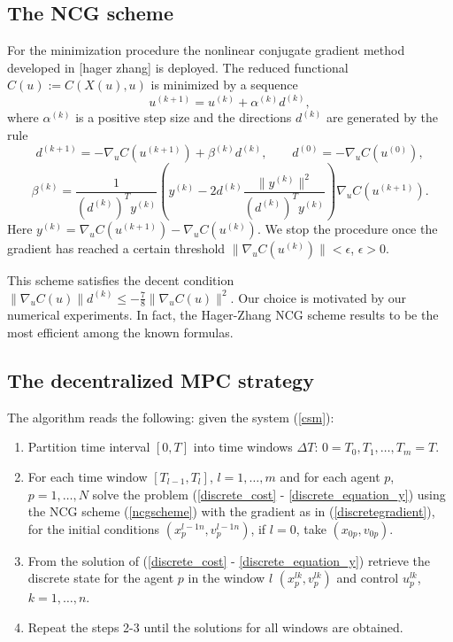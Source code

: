 \documentclass[a4paper,10pt, english]{article}
\begin{document}
 \subsection{The NCG scheme}
  For the minimization procedure the nonlinear conjugate gradient  method developed in [hager zhang] is deployed.
  The reduced functional $C(u):=C(X(u), u)$ is minimized by a sequence
  \begin{equation}
  u^{(k+1)} =   u^{(k)} + \alpha^{(k)} d^{(k)},
  \label{ncgscheme}
   \end{equation}  
  where $\alpha^{(k)}$ is a positive step size and the directions $d^{(k)}$ are generated by the rule
  \begin{equation}
  d^{(k+1)} = - \nabla_u C(u^{(k+1)}) + \beta^{(k)} d^{(k)}, \qquad d^{(0)} = -\nabla_u C(u^{(0)}),
  \label{drct}
  \end{equation}
  \begin{equation}
  \beta^{(k)} = \frac{1}{(d^{(k)})^T y^{(k)}} \left( y^{(k)} - 2d^{(k)}\frac{\|y^{(k)}\|^2}{(d^{(k)})^T y^{(k)}}\right)\nabla_u C(u^{(k+1)}).
  \label{drct}
  \end{equation}  
  Here $y^{(k)} = \nabla_u C(u^{(k+1)}) - \nabla_u C(u^{(k)})$. 
  We stop the procedure once the gradient has reached a certain threshold $\|\nabla_u C(u^{(k)})\| < \epsilon$, $\epsilon > 0$.
   
  This scheme satisfies the decent condition $\|\nabla_u C(u)\|d^{(k)} \leq -\frac{7}{8}\|\nabla_u C(u)\|^2$. Our choice is motivated by our numerical experiments. In fact, the Hager-Zhang NCG scheme results to be the most efficient among the known formulas. 
  
  
 
 \subsection{The decentralized MPC strategy}
  The algorithm reads the following: given the system (\ref{csm}):
  
 \begin{enumerate}
   \item Partition time interval $[0, T]$ into time windows $\Delta T$: $0 = T_0, T_1, \dots, T_m = T$.
   \item For each time window  $[T_{l-1}, T_{l}]$, $l = 1, \dots, m$ and for each agent $p$, $p = 1, \dots, N$  solve the problem (\ref{discrete_cost} - \ref{discrete_equation_y}) using the NCG scheme (\ref{ncgscheme}) with the gradient as in (\ref{discretegradient}), for the initial conditions $(x^{l-1n}_p, v^{l-1 n}_p)$, if $l = 0$, take $(x_{0p}, v_{0p})$.
   \item From the solution of (\ref{discrete_cost} - \ref{discrete_equation_y})  retrieve the discrete state for the agent $p$ in the window $l$ $(x^{lk}_p, v^{lk}_p)$ and control $u^{lk}_p$, $k = 1, \dots, n$.
   \item Repeat the steps 2-3 until the solutions for all windows are obtained.
 \end{enumerate}
 
\end{document}
